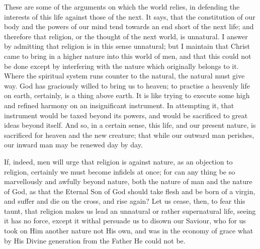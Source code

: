 These are some of the arguments on which the world relies, in
defending the interests of this life against those of the next. It
says, that the constitution of our body and the powers of our mind
tend towards an end short of the next life; and therefore that
religion, or the thought of the next world, is unnatural. I answer by
admitting that religion is in this sense unnatural; but I maintain
that Christ came to bring in a higher nature into this world of men,
and that this could not be done except by interfering with the nature
which originally belongs to it. Where the spiritual system runs
counter to the natural, the natural must give way. God has graciously
willed to bring us to heaven; to practise a heavenly life on earth,
certainly, is a thing above earth. It is like trying to execute some
high and refined harmony on an insignificant instrument. In attempting
it, that instrument would be taxed beyond its powers, and would be
sacrificed to great ideas beyond itself. And so, in a certain sense,
this life, and our present nature, is sacrificed for heaven and the
new creature; that while our outward man perishes, our inward man may
be renewed day by day.

If, indeed, men will urge that religion is against nature, as an
objection to religion, certainly we must become infidels at once; for
can any thing be so marvellously and awfully beyond nature, both the
nature of man and the nature of God, as that the Eternal Son of God
should take flesh and be born of a virgin, and suffer and die on the
cross, and rise again? Let us cease, then, to fear this taunt, that
religion makes us lead an unnatural or rather supernatural life,
seeing it has no force, except it withal persuade us to disown our
Saviour, who for us took on Him another nature not His own, and was in
the economy of grace what by His Divine generation from the Father He
could not be.

